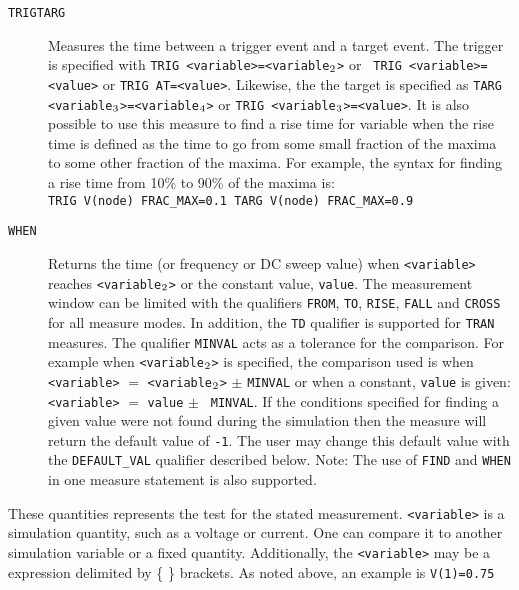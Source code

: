 \begin{Command}
\begin{Arguments}
\begin{description}
  \item[\vbox{\hbox{\tt TRIG\hfil}\hbox{\tt TARG\hfil}}] Measures the
    time between a trigger event and a target event.  The trigger is
    specified with {\tt TRIG <variable>=<variable\(\sb{2}\)>} or {\tt
    TRIG <variable>=<value>} or {\tt TRIG AT=<value>}.  Likewise, the
    the target is specified as {\tt TARG
    <variable\(\sb{3}\)>=<variable\(\sb{4}\)>} or {\tt TRIG
    <variable\(\sb{3}\)>=<value>}.  It is also possible to use this
    measure to find a rise time for variable when the rise time is
    defined as the time to go from some small fraction of the maxima
    to some other fraction of the maxima.  For example, the syntax for
    finding a rise time from 10\% to 90\% of the maxima
    is:\\ \texttt{TRIG V(node) FRAC\_MAX=0.1 TARG V(node)
    FRAC\_MAX=0.9}

  \item[\tt WHEN] Returns the time (or frequency or DC sweep value) when
    {\tt <variable>} reaches {\tt <variable\(\sb{2}\)>} or the constant
    value, {\tt value}.  The measurement window can be limited with the
    qualifiers {\tt FROM}, {\tt TO}, {\tt RISE}, {\tt FALL} and {\tt CROSS}
    for all measure modes.  In addition, the {\tt TD} qualifier is supported
    for {\tt TRAN} measures. The qualifier {\tt MINVAL} acts as a
    tolerance for the comparison.  For example when {\tt <variable\(\sb{2}\)>}
    is specified, the comparison used is when {\tt <variable>} $=$
    {\tt <variable\(\sb{2}\)>} $\pm$ {\tt MINVAL} or when a constant,
    {\tt value} is given: {\tt <variable>} $=$ {\tt value} $\pm$ {\tt
    MINVAL}.  If the conditions specified for finding a given value
    were not found during the simulation then the measure will return
    the default value of {\tt -1}.  The user may change this default
    value with the {\tt DEFAULT\_VAL} qualifier described below.
    Note: The use of {\tt FIND} and {\tt WHEN} in one measure
    statement is also supported.
\end{description}


These quantities represents the test for the stated
measurement.  \texttt{<variable>} is a simulation quantity, such as a
voltage or current.  One can compare it to another simulation variable
or a fixed quantity.  Additionally, the \texttt{<variable>} may be
a \Xyce{} expression delimited by \{ \} brackets.  As noted above, an
example is {\tt V(1)=0.75}


\end{Arguments}
\end{Command}
